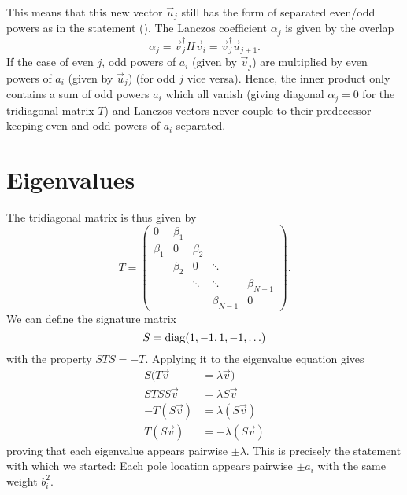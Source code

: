 This means that this new vector $\vec{u}_j$ still has the form of separated even/odd powers
as in the statement ().
The Lanczos coefficient $\alpha_j$ is given by the overlap
\begin{equation}
    \alpha_j
    =
    \vec{v}_j^\dagger H \vec{v}_i
    =
    \vec{v}_j^\dagger \vec{u}_{j+1}.
\end{equation}
If the case of even $j$, odd powers of $a_i$ (given by $\vec{v}_j$)
are multiplied by even powers of $a_i$ (given by $\vec{u}_j$)
(for odd $j$ vice versa).
Hence, the inner product only contains a sum of odd powers $a_i$ which all vanish
(giving diagonal $\alpha_j = 0$ for the tridiagonal matrix $T$)
and Lanczos vectors never couple to their predecessor
keeping even and odd powers of $a_i$ separated.

\section{Eigenvalues}


The tridiagonal matrix is thus given by
\begin{equation}
    T
    =
    \begin{pmatrix}
        0       & \beta_1 &         &             &             \\
        \beta_1 & 0       & \beta_2 &             &             \\
                & \beta_2 & 0       & \ddots      &             \\
                &         & \ddots  & \ddots      & \beta_{N-1} \\
                &         &         & \beta_{N-1} & 0
    \end{pmatrix}.
\end{equation}
We can define the signature matrix
\begin{equation}
    S = \operatorname{diag}(1, -1, 1, -1, \ldots)
\end{equation}
with the property $S T S = -T$.
Applying it to the eigenvalue equation gives
\begin{align}
    S(T \vec{v}   & = \lambda \vec{v})    \\
    ST SS\vec{v}  & = \lambda S\vec{v}    \\
    -T (S\vec{v}) & = \lambda (S\vec{v})  \\
    T (S\vec{v})  & = -\lambda (S\vec{v})
\end{align}
proving that each eigenvalue appears pairwise $\pm\lambda$.
This is precisely the statement with which we started:
Each pole location appears pairwise $\pm a_i$ with the same weight $b_i^2$.

